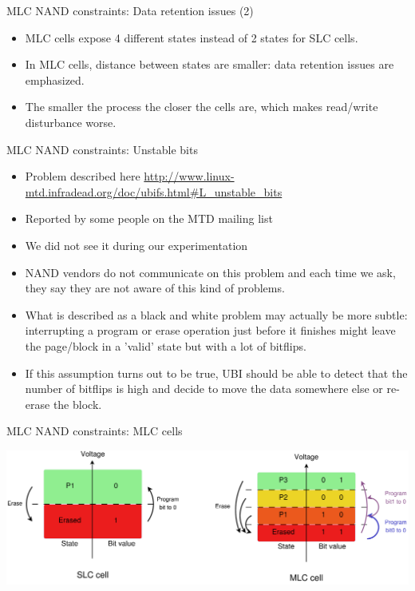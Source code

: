 \documentclass[aspectratio=169,obeyspaces,spaces,hyphens,dvipsnames]{beamer}
\begin{document}
\begin{frame}{MLC NAND constraints: Data retention issues (2)}
  \begin{itemize}
  \item MLC cells expose 4 different states instead of 2 states for
	SLC cells.
  \item In MLC cells, distance between states are smaller: data
	retention issues are emphasized.
  \item The smaller the process the closer the cells are, which makes
	read/write disturbance worse.
  \end{itemize}
\end{frame}

\begin{frame}{MLC NAND constraints: Unstable bits}
  \begin{itemize}
  \item Problem described here
	\url{http://www.linux-mtd.infradead.org/doc/ubifs.html\#L_unstable_bits}
  \item Reported by some people on the MTD mailing list
  \item We did not see it during our experimentation
  \item NAND vendors do not communicate on this problem and each
	time we ask, they say they are not aware of this kind of
	problems.
  \item What is described as a black and white problem may actually
	be more subtle: interrupting a program or erase operation
	just before it finishes might leave the page/block in a 'valid'
	state but with a lot of bitflips.
  \item If this assumption turns out to be true, UBI should be able to
	detect that the number of bitflips is high and decide to move
	the data somewhere else or re-erase the block.
  \end{itemize}
\end{frame}

\begin{frame}{MLC NAND constraints: MLC cells}
  \begin{center}
    \includegraphics[scale=0.2]{slc-mlc-cell.pdf}
  \end{center}
\end{frame}
\end{document}
